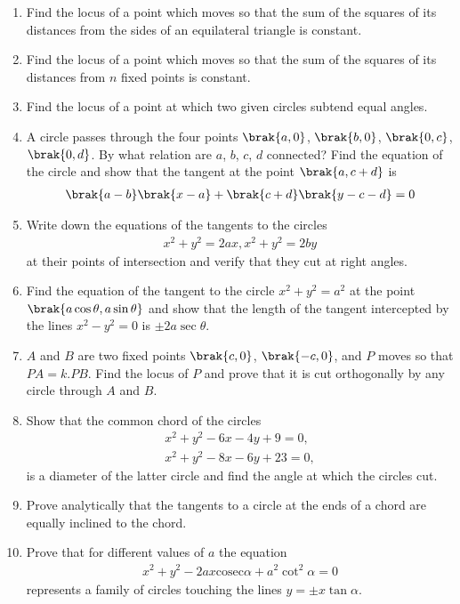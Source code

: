 \begin{enumerate}[1.]
\item Find the locus of a point which moves so that the sum of the squares of its distances from the sides of an equilateral triangle
is constant.
\item Find the locus of a point which moves so that the sum of the squares of its distances from $n$ fixed points is constant.
\item Find the locus of a point at which two given circles
subtend equal angles.
\item A circle passes through the four points $\brak{a,0}$, $\brak{b,0}$, $\brak{0,c}$, $\brak{0,d}$.  By what relation 
are $a$, $b$, $c$, $d$ connected?  Find the equation of the 
circle and show that the tangent at the point $\brak{a,c+d}$ is
\begin{align*}
\brak{a-b}\brak{x-a}+\brak{c+d}\brak{y-c-d}=0
\end{align*}
\item Write down the equations of the tangents to the circles
\begin{align*}
x^2 + y^2 =2ax, x^2+ y^2 =2by
\end{align*}
at their points of intersection and verify that they cut at right angles.
\item Find the equation of the tangent to the circle $x^2 + y^2 =a^2$ at the point $\brak{a\cos\theta,a\sin\theta}$ and show that the length of the
tangent intercepted by the lines $x^2-y^2 = 0$ is $\pm 2a\sec\theta$.
\item $A$ and $B$ are two fixed points $\brak{c,0}$, $\brak{-c,0}$, and $P$ moves so that $PA=k.PB$.  Find the locus of $P$ and prove that it is 
cut orthogonally by any circle through $A$ and $B$.
\item Show that the common chord of the circles
\begin{align*}
x^2 +y^2 -6x -4y+9 =0,
\\
x^2+ y^2 -8x -6y+23 =0,
\end{align*}
is a diameter of the latter circle and find the angle at which the circles cut.
\item Prove analytically that the tangents to a circle at the ends of a chord are equally inclined to the chord.
\item Prove that for different values of $a$ the equation
\begin{align*}
x^2 +y^2 -2ax\text{cosec}\alpha +a^2\cot^2\alpha =0
\end{align*}
represents a family of circles touching the lines $y=\pm x\tan\alpha$.


\end{enumerate}
